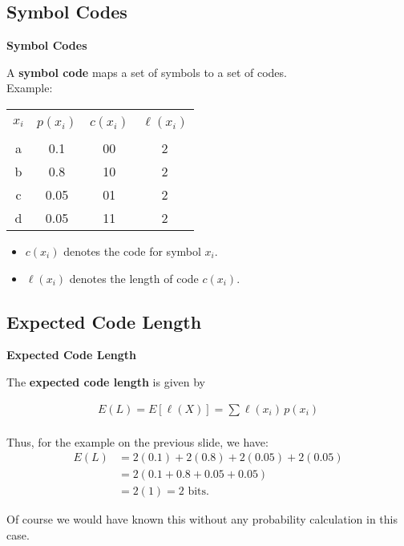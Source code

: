 \documentclass[compress]{beamer}        %
\makeatletter
\newcommand{\tcb}{\textcolor{beamer@blendedblue}}
\makeatother
\begin{document}
\subsection{Symbol Codes}
\begin{frame}{\bf \tcb{Symbol Codes}}

A {\bf symbol code} maps a set of symbols to a set of codes.\\[0.4cm]

Example:
\begin{center}
\begin{tabular}{|cccc|}
\hline
&&&\\[-0.4cm]
$x_i$ & $p(x_i)$ & $c(x_i)$ & $\ell(x_i)$ \\[0.1cm]
\hline
&&&\\[-0.4cm]
a     & 0.1      &  00  &  2     \\[0.1cm]
b     & 0.8      &  10  &  2     \\[0.1cm]
c     & 0.05     &  01  &  2     \\[0.1cm]
d     & 0.05     &  11  &  2     \\[0.1cm]
\hline
\end{tabular}
\end{center}

\begin{itemize}\itemsep0.4cm
\item $c(x_i)$ denotes the code for symbol $x_i$.
\item $\ell(x_i)$ denotes the length of code $c(x_i)$.
\end{itemize}

\end{frame}



\subsection{Expected Code Length}
\begin{frame}{\bf \tcb{Expected Code Length}}

The {\bf expected code length} is given by

\begin{align*}
\boxed{E(L) = E[\ell(X)] = \sum \ell(x_i)\,p(x_i)}\\
\end{align*}

Thus, for the example on the previous slide, we have:
\begin{align*}
E(L) &= 2(0.1) + 2(0.8) + 2(0.05) + 2(0.05) \\[0.2cm]
&= 2(0.1 + 0.8 + 0.05 + 0.05) \\[0.2cm]
&= 2(1) = 2 \text{ bits}.
\end{align*}

Of course we would have known this without any probability calculation in this case.

\end{frame}
\end{document}

